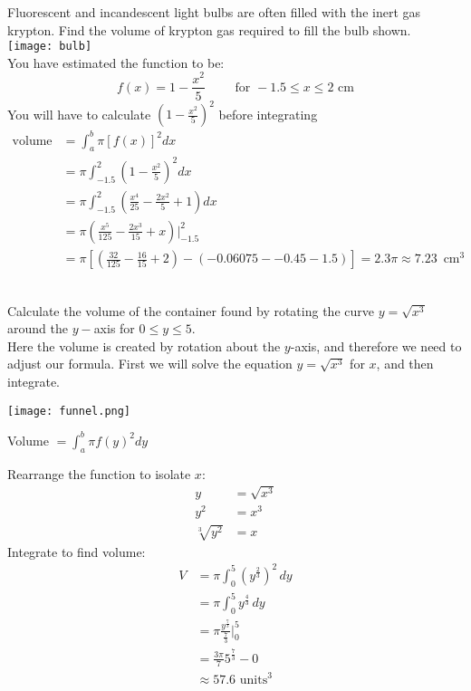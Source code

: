 \example Fluorescent and incandescent light bulbs are often filled with the inert gas krypton. Find the volume of krypton gas required to fill the bulb shown.\vspace{0.4cm}\\ 
\texttt{[image: bulb]}\\
You have estimated the function to be:\\
\[f(x)=1-\frac{x^2}{5}\qquad\text{ for } -1.5\leq x \leq 2\text{ cm}\] 
\solution You will have to calculate $\left(1-\frac{x^2}{5}\right)^2$ before integrating\\
	\begin{align*}
	\text{volume}&=\int_{a}^{b}\pi[f(x)]^2 dx\\
	&=\pi\int_{-1.5}^{2}\left(1-\frac{x^2}{5}\right)^2 dx\\
	&=\pi\int_{-1.5}^{2}\left(\frac{x^4}{25}-\frac{2x^2}{5}+1\right)dx\\
	&=\pi\left(\frac{x^5}{125}-\frac{2x^3}{15}+x\right)  \Bigg|_{-1.5}^2\\
	&=\pi\left[\left(\frac{32}{125}-\frac{16}{15}+2\right)-\left(-0.06075--0.45-1.5\right)\right]=2.3\pi\approx 7.23\, \text{ cm}^3\end{align*}
\\	
\begin{multicols}{2}
\example Calculate the volume of the container found by rotating the curve $y=\sqrt{x^3}$ around the $y-$axis for $0\leq y \leq 5$.\\

Here the volume is created by rotation about the $y$-axis, and therefore we need to adjust our formula. First we will solve the equation $y=\sqrt{x^3}$ for $x$, and then integrate.
\columnbreak
\begin{center}
		\texttt{[image: funnel.png]}
\end{center}
\end{multicols}

\solution Volume $=\int_{a}^{b} \pi f(y)^2 dy$\\
\begin{multicols}{2}
Rearrange the function to isolate $x$:
	\begin{align*}
	y&=\sqrt{x^3}\\
	y^2&=x^3\\
	\sqrt[3]{y^2}&=x\end{align*}
Integrate to find volume:\\
	\begin{align*}V&=\pi\int_{0}^{5} (y^{\frac{2}{3}})^2\,dy\\
	&=\pi\int_{0}^{5} y^{\frac{4}{3}}\,dy\\
	&=\pi\frac{y^{\frac{7}{3}}}{\frac{7}{3}}\bigg\vert_{0}^{5}\\
	&=\frac{3\pi}{7}5^{\frac{7}{3}}-0\\
	&\approx 57.6 \,\,\mathrm{units}^3
	\end{align*}
\end{multicols}

